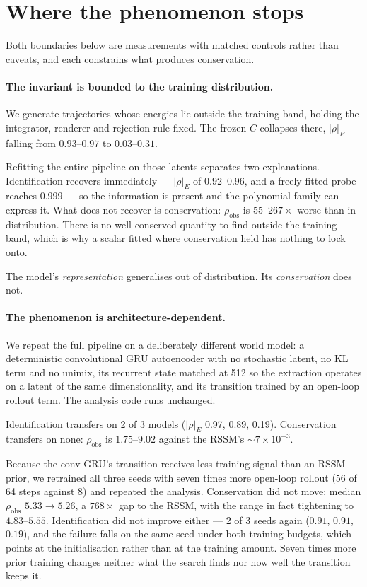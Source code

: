 \section{Where the phenomenon stops}
\label{sec:boundaries}

Both boundaries below are measurements with matched controls rather than caveats, and each
constrains what produces conservation.

\paragraph{The invariant is bounded to the training distribution.}
We generate trajectories whose energies lie outside the training band, holding the integrator,
renderer and rejection rule fixed. The frozen $C$ collapses there, $|\rho|_E$ falling from
$0.93$--$0.97$ to $0.03$--$0.31$.

Refitting the entire pipeline on those latents separates two explanations. Identification recovers
immediately --- $|\rho|_E$ of $0.92$--$0.96$, and a freely fitted probe reaches $0.999$ --- so the
information is present and the polynomial family can express it. What does not recover is
conservation: $\rho_{\mathrm{obs}}$ is $55$--$267\times$ worse than in-distribution. There is no
well-conserved quantity to find outside the training band, which is why a scalar fitted where
conservation held has nothing to lock onto.

The model's \emph{representation} generalises out of distribution. Its \emph{conservation} does not.

\paragraph{The phenomenon is architecture-dependent.}
We repeat the full pipeline on a deliberately different world model: a deterministic convolutional
GRU autoencoder with no stochastic latent, no KL term and no unimix, its recurrent state matched at
512 so the extraction operates on a latent of the same dimensionality, and its transition trained by
an open-loop rollout term. The analysis code runs unchanged.

Identification transfers on 2 of 3 models ($|\rho|_E$ 0.97, 0.89, 0.19). Conservation transfers on
none: $\rho_{\mathrm{obs}}$ is $1.75$--$9.02$ against the RSSM's ${\sim}7\times10^{-3}$.

Because the conv-GRU's transition receives less training signal than an RSSM prior, we retrained all
three seeds with seven times more open-loop rollout (56 of 64 steps against 8) and repeated the
analysis. Conservation did not move: median $\rho_{\mathrm{obs}}$ $5.33 \to 5.26$, a $768\times$ gap
to the RSSM, with the range in fact tightening to $4.83$--$5.55$. Identification did not improve
either --- 2 of 3 seeds again ($0.91$, $0.91$, $0.19$), and the failure falls on the same seed under
both training budgets, which points at the initialisation rather than at the training amount. Seven
times more prior training changes neither what the search finds nor how well the transition keeps it.

